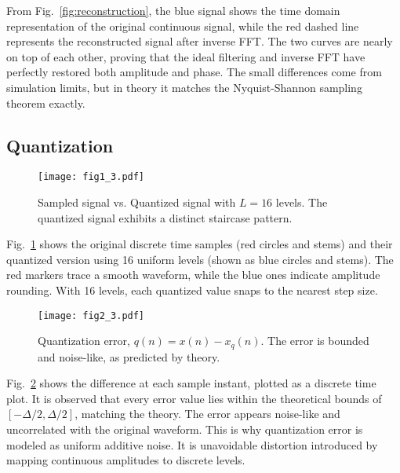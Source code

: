 \documentclass[conference]{IEEEtran}
\begin{document}
From Fig.~\ref{fig:reconstruction}, the blue signal shows the time domain representation of the original continuous signal, while the red dashed line represents the reconstructed signal after inverse FFT. The two curves are nearly on top of each other, proving that the ideal filtering and inverse FFT have perfectly restored both amplitude and phase. The small differences come from simulation limits, but in theory it matches the Nyquist-Shannon sampling theorem exactly.

\subsection{Quantization}

\begin{figure}[H]
    \centering
    \texttt{[image: fig1\_3.pdf]}
    \caption{Sampled signal vs. Quantized signal with $L=16$ levels. The quantized signal exhibits a distinct staircase pattern.}
    \label{fig:quantized}
\end{figure}

Fig.~\ref{fig:quantized} shows the original discrete time samples (red circles and stems) and their quantized version using 16 uniform levels (shown as blue circles and stems). The red markers trace a smooth waveform, while the blue ones indicate amplitude rounding. With 16 levels, each quantized value snaps to the nearest step size.

\begin{figure}[H]
    \centering
    \texttt{[image: fig2\_3.pdf]}
    \caption{Quantization error, $q(n) = x(n) - x_q(n)$. The error is bounded and noise-like, as predicted by theory.}
    \label{fig:error}
\end{figure}

Fig.~\ref{fig:error} shows the difference at each sample instant, plotted as a discrete time plot. It is observed that every error value lies within the theoretical bounds of $[-\Delta/2, \Delta/2]$, matching the theory. The error appears noise-like and uncorrelated with the original waveform. This is why quantization error is modeled as uniform additive noise. It is unavoidable distortion introduced by mapping continuous amplitudes to discrete levels.
\end{document}
